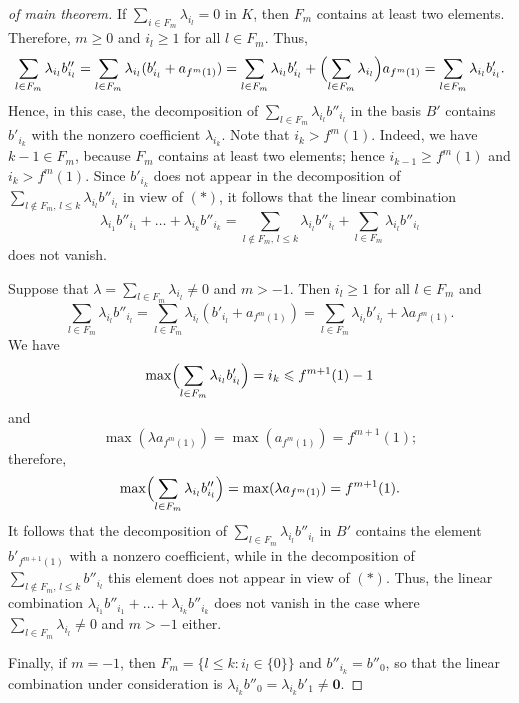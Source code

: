 \documentclass[a4paper]{amsart}
\theoremstyle{definition}
\let\le\leqslant
\let\ge\geqslant
\begin{document}
\begin{proof}[of main theorem]
If $\sum_{i\in F_m} \lambda_{i_l}=0$ in $K$, then $F_m$ contains at least two elements. Therefore, $m\ge 0$ 
and $i_l\ge 1$ for all $l\in F_m$. Thus, 
$$ 
\sum_{l\in F_m}\lambda_{i_l} b''_{i_l} = \sum_{l\in F_m} \lambda_{i_l} (b'_{i_l}+a_{f^{m}(1)}) = 
\sum_{l\in F_m} \lambda_{i_l} b'_{i_l}+ \Bigl(\sum_{l\in F_m} \lambda_{i_l}\Bigr) a_{f^{m}(1)} =
\sum_{l\in F_m} 
\lambda_{i_l}b'_{i_l}. 
$$ 
Hence, in this case, the decomposition of $\sum_{l\in F_m}\lambda_{i_l} b''_{i_l}$ in the basis $B'$ contains 
$b'_{i_k}$ with the nonzero coefficient $\lambda_{i_k}$. Note that $i_k > f^{m}(1)$. Indeed, 
we have $k-1\in F_m$, because $F_m$ contains at least two elements; 
hence  $i_{k-1}\ge f^{m}(1)$ and $i_k > f^{m}(1)$. Since 
$b'_{i_k}$ does not appear in the  decomposition of $\sum_{l\notin F_m,\, l\le k}\lambda_{i_l} b''_{i_l}$ in view of $(*)$, 
it follows that the linear combination 
$$
\lambda_{i_1}b''_{i_1} + \dots + \lambda_{i_k}b''_{i_k}= \sum_{l\notin F_m,\,l\le k}\lambda_{i_l} b''_{i_l} + 
\sum_{l\in F_m}\lambda_{i_l} b''_{i_l}
$$ 
does not vanish.

Suppose that $\lambda=\sum_{l\in F_m}\lambda_{i_l}\ne 0$ and $m>-1$. Then $i_l\ge 1$ for all $l\in F_m$ and 
$$ 
\sum_{l\in F_m}\lambda_{i_l} b''_{i_l} = \sum_{l\in F_m}\lambda_{i_l} (b'_{i_l}+a_{f^{m}(1)}) = \sum_{l\in 
F_m}\lambda_{i_l} b'_{i_l} + \lambda a_{f^{m}(1)}.  
$$ 
We have 
$$ 
\max \Bigl(\sum_{l\in F_m}\lambda_{i_l} b'_{i_l}\Bigr)= i_k \le f^{m+1}(1)-1
$$
and 
$$
\max(\lambda a_{f^m(1)})= \max(a_{f^m(1)})=f^{m+1}(1);   
$$ 
therefore, 
$$ 
\max \Bigl(\sum_{l\in F_m}\lambda_{i_l} b''_{i_l}\Bigr)= \max(\lambda a_{f^{m}(1)}) = f^{m+1}(1). 
$$ 
It follows that the decomposition of $\sum_{l\in F_m}\lambda_{i_l} b''_{i_l}$ in $B'$ contains the element 
$b'_{f^{m+1}(1)}$ with a nonzero  coefficient, while in the decomposition of 
$\sum_{l\notin F_m,\,l\le k} b''_{i_l}$ this element does not appear in view of $(*)$.  
Thus, the linear combination $\lambda_{i_1}b''_{i_1} + \dots + \lambda_{i_k}b''_{i_k}$ does not vanish in the 
case where $\sum_{l\in F_m}\lambda_{i_l}\ne 0$ and $m>-1$ either. 

Finally, if $m=-1$, then $F_m=\bigl\{l\le k:i_l\in \{0\}\bigr\}$ and $b''_{i_k}=b''_0$, so that the linear 
combination under consideration is $\lambda_{i_k}b''_0=\lambda_{i_k} b'_1\ne\mathbf 0$. 


\end{proof}
\end{document}
